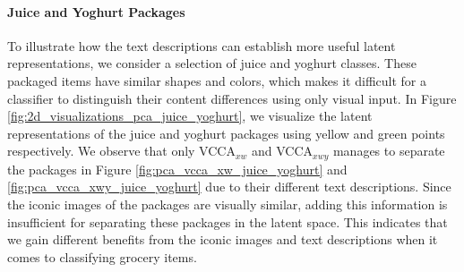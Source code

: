 

\paragraph{Juice and Yoghurt Packages} To illustrate how the text descriptions can establish more useful latent representations, we consider a selection of juice and yoghurt classes. These packaged items have similar shapes and colors, which makes it difficult for a classifier to distinguish their content differences using only visual input. In Figure \ref{fig:2d_visualizations_pca_juice_yoghurt}, we visualize the latent representations of the juice and yoghurt packages using yellow and green points respectively. We observe that only VCCA$_{x w}$ and VCCA$_{x w y}$ manages to separate the packages in Figure \ref{fig:pca_vcca_xw_juice_yoghurt} and \ref{fig:pca_vcca_xwy_juice_yoghurt} due to their different text descriptions. Since the iconic images of the packages are visually similar, adding this information is insufficient for separating these packages in the latent space. This indicates that we gain different benefits from the iconic images and text descriptions when it comes to classifying grocery items.



